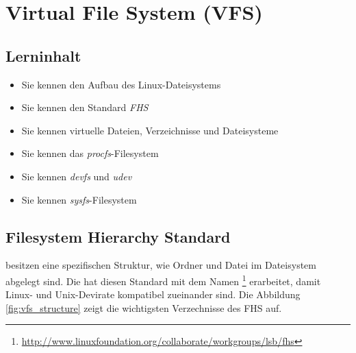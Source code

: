 \section{Virtual File System (VFS)}
\label{sec:vfs}

\subsection{Lerninhalt}

\begin{itemize}
   \item Sie kennen den Aufbau des Linux-Dateisystems
   \item Sie kennen den Standard \emph{FHS}
   \item Sie kennen virtuelle Dateien, Verzeichnisse und Dateisysteme
   \item Sie kennen das \emph{procfs}-Filesystem
   \item Sie kennen \emph{devfs} und \emph{udev}
   \item Sie kennen \emph{sysfs}-Filesystem
\end{itemize}

\subsection{Filesystem Hierarchy Standard}

 besitzen eine spezifischen Struktur, wie Ordner und Datei
im Dateisystem abgelegt sind. Die  hat diesen Standard mit dem
Namen \footnote{\url{http://www.linuxfoundation.org/collaborate/workgroups/lsb/fhs}} erarbeitet, damit Linux- und 
Unix-Devirate kompatibel zueinander sind. Die Abbildung \ref{fig:vfs_structure} zeigt die wichtigsten Verzechnisse des FHS auf.

